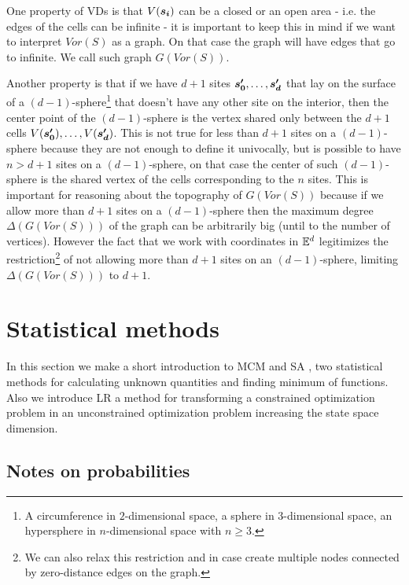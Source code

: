 \documentclass[dissertation.tex]{subfiles}
\begin{document}
One property of \acp{VD} is that $V(\boldsymbol{s_i})$ can be a closed or an
open area - i.e. the edges of the cells can be infinite - it is important
to keep this in mind if we want to interpret $Vor(S)$ as a graph. On
that case the graph will have edges that go to infinite. We call such
graph $G(Vor(S))$.

Another property is that if we have $d+1$ sites $\boldsymbol{s_0'},\dots,\boldsymbol{s_d'}$ that lay on the
surface of a $(d-1)$-sphere\footnote{A circumference in $2$-dimensional
  space, a sphere in $3$-dimensional space, an hypersphere in
  $n$-dimensional space with $n\ge 3$.} that doesn't have any other site on
the interior, then the center point of the $(d-1)$-sphere is the
vertex shared only between the $d+1$ cells
$V(\boldsymbol{s_0'}),\dots,V(\boldsymbol{s_d'})$. This is not true for less than
$d+1$ sites on a
$(d-1)$-sphere because they are not enough to define it univocally,
but is possible to have $n>d+1$ sites on a $(d-1)$-sphere, on that
case the center of such $(d-1)$-sphere is the shared vertex of the
cells corresponding to the $n$ sites. This is important for reasoning
about the topography of $G(Vor(S))$ because if we allow more than
$d+1$ sites on a $(d-1)$-sphere then the maximum degree
$\Delta(G(Vor(S)))$ of the graph can be arbitrarily big (until to the
number of vertices). However the fact that we work with coordinates in
$\mathbb{E}^d$ legitimizes the restriction\footnote{We can also relax this
  restriction and in case create multiple nodes connected by zero-distance
  edges on the graph.} of not
allowing more than $d+1$ sites on an $(d-1)$-sphere, limiting
$\Delta(G(Vor(S)))$ to $d+1$.

\section{Statistical methods}\label{sec:statisticalMethods}
In this section we make a short introduction to \acf{MCM}
\cite{metropolis}\cite{sobol}\cite{newman} and \acf{SA} \cite{kirkpatrick}\cite{ho},
two statistical methods for calculating unknown quantities and finding
minimum of functions. Also we introduce \acf{LR} \cite{benjamin} a
method for transforming a constrained optimization problem in an
unconstrained optimization problem increasing the state space
dimension.
\subsection{Notes on probabilities}
\end{document}
